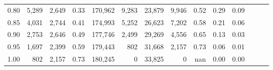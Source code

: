 \begin{tabular}{rrrrrrrrrrrrrr}
0.80 &   5,289 &  2,649 &  0.33 &  170,962 &    9,283 &  23,879 &   9,946 &  0.52 &  0.29 &      0.09 \\
0.85 &   4,031 &  2,744 &  0.41 &  174,993 &    5,252 &  26,623 &   7,202 &  0.58 &  0.21 &      0.06 \\
0.90 &   2,753 &  2,646 &  0.49 &  177,746 &    2,499 &  29,269 &   4,556 &  0.65 &  0.13 &      0.03 \\
0.95 &   1,697 &  2,399 &  0.59 &  179,443 &      802 &  31,668 &   2,157 &  0.73 &  0.06 &      0.01 \\
1.00 &     802 &  2,157 &  0.73 &  180,245 &        0 &  33,825 &       0 &   nan &  0.00 &      0.00 \\
\bottomrule
\end{tabular}
